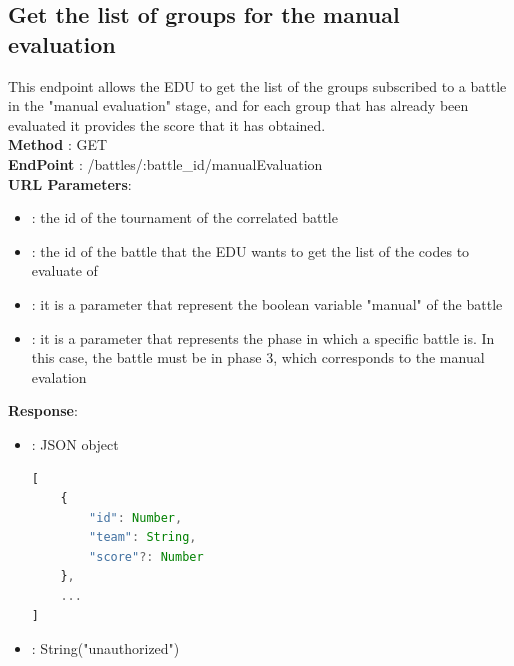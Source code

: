 \subsection*{Get the list of groups for the manual evaluation}
This endpoint allows the EDU to get the list of the groups subscribed to a battle in the "manual evaluation" stage, and for each group that has already been evaluated it provides the score that it has obtained.\\
\textbf{Method} : GET \\
\textbf{EndPoint} : /battles/:battle\_id/manualEvaluation \\
\textbf{URL Parameters}:
\begin{itemize}
    \item {} : the id of the tournament of the correlated battle
    \item {} : the id of the battle that the EDU wants to get the list of the codes to evaluate of
    \item {} : it is a parameter that represent the boolean variable "manual" of the battle
    \item {} : it is a parameter that represents the phase in which a specific battle is. In this case, the battle must be in phase 3, which corresponds to the manual evalation
\end{itemize}
\textbf{Response}:
\begin{itemize}
    \item {} : JSON object
          \begin{lstlisting}[language=JavaScript, label={lst:jscode}, basicstyle=\ttfamily]
[
    {
        "id": Number,
        "team": String,
        "score"?: Number
    },
    ...
]
        \end{lstlisting}
    \item {} : String("unauthorized")
\end{itemize}

